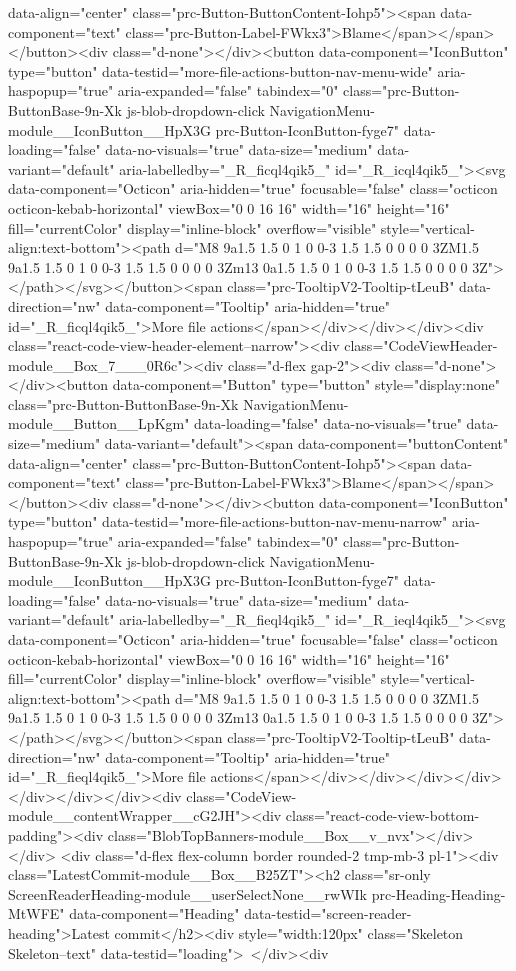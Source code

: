 {{{{{{{data-align="center" class="prc-Button-ButtonContent-Iohp5"><span data-component="text" class="prc-Button-Label-FWkx3">Blame</span></span></button><div class="d-none"></div><button data-component="IconButton" type="button" data-testid="more-file-actions-button-nav-menu-wide" aria-haspopup="true" aria-expanded="false" tabindex="0" class="prc-Button-ButtonBase-9n-Xk js-blob-dropdown-click NavigationMenu-module__IconButton__HpX3G prc-Button-IconButton-fyge7" data-loading="false" data-no-visuals="true" data-size="medium" data-variant="default" aria-labelledby="_R_ficql4qik5_" id="_R_icql4qik5_"><svg data-component="Octicon" aria-hidden="true" focusable="false" class="octicon octicon-kebab-horizontal" viewBox="0 0 16 16" width="16" height="16" fill="currentColor" display="inline-block" overflow="visible" style="vertical-align:text-bottom"><path d="M8 9a1.5 1.5 0 1 0 0-3 1.5 1.5 0 0 0 0 3ZM1.5 9a1.5 1.5 0 1 0 0-3 1.5 1.5 0 0 0 0 3Zm13 0a1.5 1.5 0 1 0 0-3 1.5 1.5 0 0 0 0 3Z"></path></svg></button><span class="prc-TooltipV2-Tooltip-tLeuB" data-direction="nw" data-component="Tooltip" aria-hidden="true" id="_R_ficql4qik5_">More file actions</span></div></div></div><div class="react-code-view-header-element--narrow"><div class="CodeViewHeader-module__Box_7___0R6c"><div class="d-flex gap-2"><div class="d-none"></div><button data-component="Button" type="button" style="display:none" class="prc-Button-ButtonBase-9n-Xk NavigationMenu-module__Button__LpKgm" data-loading="false" data-no-visuals="true" data-size="medium" data-variant="default"><span data-component="buttonContent" data-align="center" class="prc-Button-ButtonContent-Iohp5"><span data-component="text" class="prc-Button-Label-FWkx3">Blame</span></span></button><div class="d-none"></div><button data-component="IconButton" type="button" data-testid="more-file-actions-button-nav-menu-narrow" aria-haspopup="true" aria-expanded="false" tabindex="0" class="prc-Button-ButtonBase-9n-Xk js-blob-dropdown-click NavigationMenu-module__IconButton__HpX3G prc-Button-IconButton-fyge7" data-loading="false" data-no-visuals="true" data-size="medium" data-variant="default" aria-labelledby="_R_fieql4qik5_" id="_R_ieql4qik5_"><svg data-component="Octicon" aria-hidden="true" focusable="false" class="octicon octicon-kebab-horizontal" viewBox="0 0 16 16" width="16" height="16" fill="currentColor" display="inline-block" overflow="visible" style="vertical-align:text-bottom"><path d="M8 9a1.5 1.5 0 1 0 0-3 1.5 1.5 0 0 0 0 3ZM1.5 9a1.5 1.5 0 1 0 0-3 1.5 1.5 0 0 0 0 3Zm13 0a1.5 1.5 0 1 0 0-3 1.5 1.5 0 0 0 0 3Z"></path></svg></button><span class="prc-TooltipV2-Tooltip-tLeuB" data-direction="nw" data-component="Tooltip" aria-hidden="true" id="_R_fieql4qik5_">More file actions</span></div></div></div></div></div></div></div><div class="CodeView-module__contentWrapper__cG2JH"><div class="react-code-view-bottom-padding"><div class="BlobTopBanners-module__Box__v_nvx"></div></div> <div class="d-flex flex-column border rounded-2 tmp-mb-3 pl-1"><div class="LatestCommit-module__Box__B25ZT"><h2 class="sr-only ScreenReaderHeading-module__userSelectNone__rwWIk prc-Heading-Heading-MtWFE" data-component="Heading" data-testid="screen-reader-heading">Latest commit</h2><div style="width:120px" class="Skeleton Skeleton--text" data-testid="loading"> </div><div }}}}}}}
